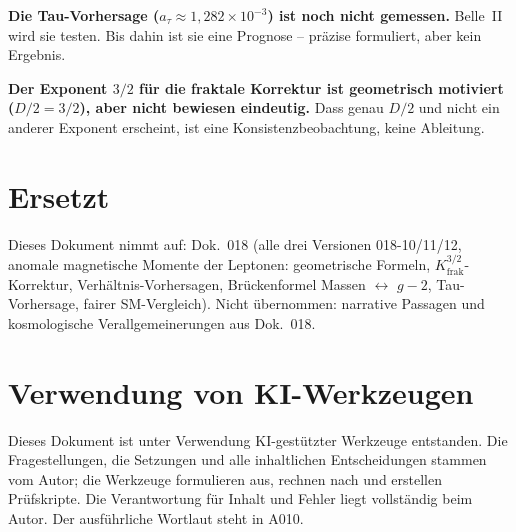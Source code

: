 \textbf{Die Tau-Vorhersage ($a_\tau\approx1{,}282\times10^{-3}$) ist noch nicht
gemessen.} Belle~II wird sie testen. Bis dahin ist sie eine Prognose --
präzise formuliert, aber kein Ergebnis.

\textbf{Der Exponent $3/2$ für die fraktale Korrektur ist geometrisch
motiviert ($D/2=3/2$), aber nicht bewiesen eindeutig.} Dass genau $D/2$
und nicht ein anderer Exponent erscheint, ist eine Konsistenzbeobachtung,
keine Ableitung.

\section{Ersetzt}

Dieses Dokument nimmt auf: Dok.~018 (alle drei Versionen 018-10/11/12,
anomale magnetische Momente der Leptonen: geometrische Formeln, $K_\text{frak}^{3/2}$-Korrektur,
Verhältnis-Vorhersagen, Brückenformel Massen $\leftrightarrow$ $g-2$,
Tau-Vorhersage, fairer SM-Vergleich). Nicht übernommen: narrative Passagen
und kosmologische Verallgemeinerungen aus Dok.~018.

\section{Verwendung von KI-Werkzeugen}

Dieses Dokument ist unter Verwendung KI-gestützter Werkzeuge entstanden. Die
Fragestellungen, die Setzungen und alle inhaltlichen Entscheidungen stammen vom
Autor; die Werkzeuge formulieren aus, rechnen nach und erstellen Prüfskripte.
Die Verantwortung für Inhalt und Fehler liegt vollständig beim Autor. Der
ausführliche Wortlaut steht in A010.
